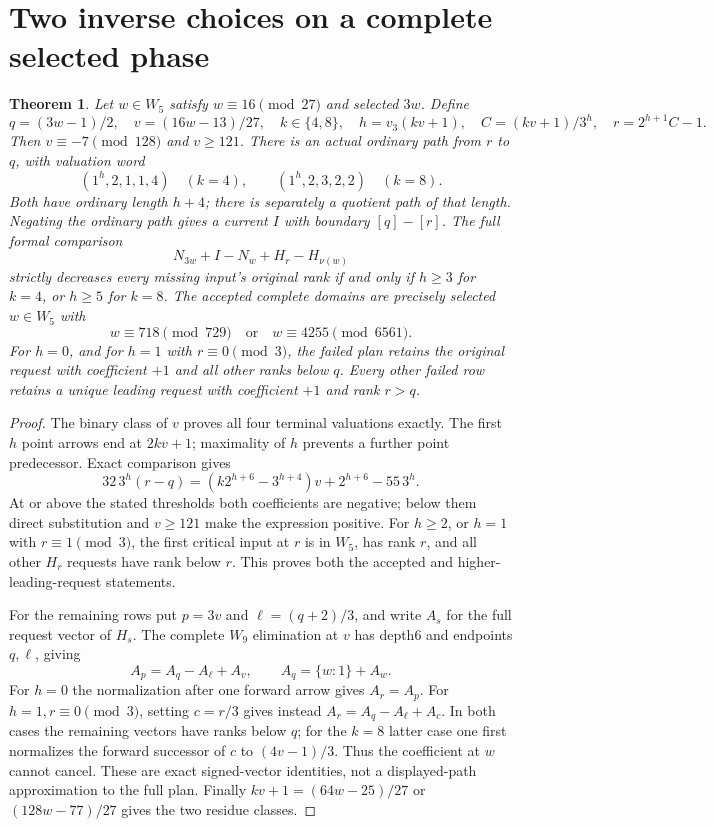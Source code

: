 \documentclass[11pt]{article}
\newtheorem{theorem}{Theorem}
\begin{document}
\section{Two inverse choices on a complete selected phase}
\begin{theorem}\label{thm:selectedinverse}
Let $w\in W_5$ satisfy $w\equiv16\pmod{27}$ and selected $3w$.
Define
\[
 q=(3w-1)/2,\quad v=(16w-13)/27,\quad
 k\in\{4,8\},\quad h=v_3(kv+1),\quad
 C=(kv+1)/3^h,\quad r=2^{h+1}C-1.
\]
Then $v\equiv-7\pmod{128}$ and $v\ge121$. There is an actual
ordinary path from $r$ to $q$, with valuation word
\[
 (1^h,2,1,1,4)\quad(k=4),\qquad
 (1^h,2,3,2,2)\quad(k=8).
\]
Both have ordinary length $h+4$; there is separately a quotient path
of that length. Negating the ordinary path gives a current $I$ with
boundary $[q]-[r]$. The full formal comparison
\[
 N_{3w}+I-N_w+H_r-H_{\nu(w)}
\]
strictly decreases every missing input's original rank if and only if
$h\ge3$ for $k=4$, or $h\ge5$ for $k=8$.
The accepted complete domains are precisely selected $w\in W_5$ with
\[
 w\equiv718\pmod{729}\quad\text{or}\quad
 w\equiv4255\pmod{6561}.
\]
For $h=0$, and for $h=1$ with $r\equiv0\pmod3$, the failed plan
retains the original request with coefficient $+1$ and all other ranks
below $q$. Every other failed row retains a unique leading request
with coefficient $+1$ and rank $r>q$.
\end{theorem}
\begin{proof}
The binary class of $v$ proves all four terminal valuations exactly.
The first $h$ point arrows end at $2kv+1$; maximality of $h$ prevents
a further point predecessor. Exact comparison gives
\[
 32\,3^h(r-q)=(k2^{h+6}-3^{h+4})v+2^{h+6}-55\,3^h.
\]
At or above the stated thresholds both coefficients are negative;
below them direct substitution and $v\ge121$ make the expression
positive. For $h\ge2$, or $h=1$ with $r\equiv1\pmod3$, the first
critical input at $r$ is in $W_5$,
has rank $r$, and all other $H_r$ requests have rank below $r$.
This proves both the accepted and higher-leading-request statements.

For the remaining rows put $p=3v$ and $\ell=(q+2)/3$, and write
$A_s$ for the full request vector of $H_s$. The complete $W_9$
elimination at $v$ has depth6 and endpoints $q,\ell$, giving
\[
 A_p=A_q-A_\ell+A_v,\qquad A_q=\{w:1\}+A_w.
\]
For $h=0$ the normalization after one forward arrow gives $A_r=A_p$.
For $h=1,r\equiv0\pmod3$, setting $c=r/3$ gives instead
$A_r=A_q-A_\ell+A_c$. In both cases the remaining vectors have
ranks below $q$; for the $k=8$ latter case one first normalizes the
forward successor of $c$ to $(4v-1)/3$. Thus the coefficient at $w$
cannot cancel. These are exact signed-vector identities, not a
displayed-path approximation to the full plan. Finally
$kv+1=(64w-25)/27$ or $(128w-77)/27$ gives the two residue classes.
\end{proof}
\end{document}

